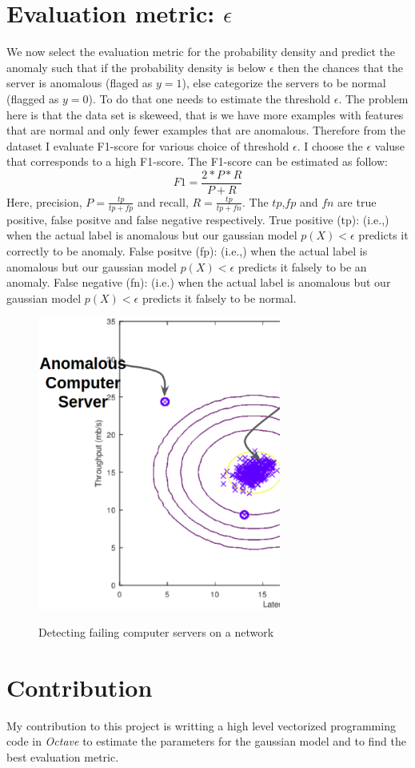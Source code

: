 \documentclass[twocolumn]{article}
\begin{document}
\section{Evaluation metric: $\epsilon$}
We now select the evaluation metric for the probability density and predict the anomaly such that if the probability density is below $\epsilon$ then the chances that the server is anomalous (flaged as $y=1$), else categorize the servers to be normal (flagged as $y=0$). To do that one needs to estimate the threshold $\epsilon$. The problem here is that the data set is skeweed, that is we have more examples with features that are normal and only fewer examples that are anomalous. Therefore from the dataset I evaluate F1-score for various choice of threshold $\epsilon$. I choose the $\epsilon$ valuse that corresponds to a high F1-score. The F1-score can be estimated as follow:
\begin{equation}
	F1 = \frac{2*P*R}{P+R}
\end{equation}
Here, precision, $P=\frac{tp}{tp+fp}$ and recall, $R = \frac{tp}{tp+fn}$. The $tp$,$fp$ and $fn$ are true positive, false positve and false negative respectively. True positive (tp): (i.e.,) when the actual label is anomalous but our gaussian model $p(X) < \epsilon$ predicts it correctly to be anomaly. False positve (fp): (i.e.,) when the actual label is anomalous but our gaussian model $p(X) < \epsilon$ predicts it falsely to be an anomaly. False negative (fn): (i.e.) when the actual label is anomalous but our gaussian model $p(X) < \epsilon$ predicts it falsely to be normal.
                \begin{figure}
                \centering
                \includegraphics[clip=true,trim=0cm 0cm 0cm 0cm,width=8cm]{model.ps}\\
			\caption{Detecting failing computer servers on a network}
                \label{fig:main}
                \end{figure}
\section{Contribution}
My contribution to this project is writting a high level vectorized programming code in {\it Octave} to estimate the parameters for the gaussian model and to find the best evaluation metric.
\end{document}

